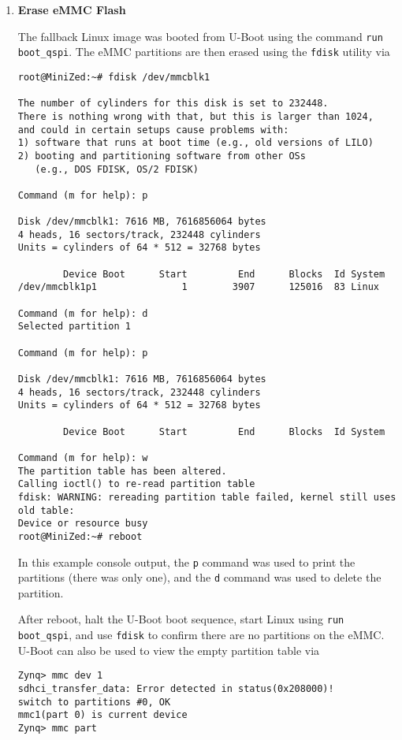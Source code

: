\begin{enumerate}
\item \textbf{Erase eMMC Flash}

The fallback Linux image was booted from U-Boot using the command
\verb+run boot_qspi+. The eMMC partitions are then erased using
the \verb+fdisk+ utility via
%
\begin{verbatim}
root@MiniZed:~# fdisk /dev/mmcblk1

The number of cylinders for this disk is set to 232448.
There is nothing wrong with that, but this is larger than 1024,
and could in certain setups cause problems with:
1) software that runs at boot time (e.g., old versions of LILO)
2) booting and partitioning software from other OSs
   (e.g., DOS FDISK, OS/2 FDISK)

Command (m for help): p

Disk /dev/mmcblk1: 7616 MB, 7616856064 bytes
4 heads, 16 sectors/track, 232448 cylinders
Units = cylinders of 64 * 512 = 32768 bytes

        Device Boot      Start         End      Blocks  Id System
/dev/mmcblk1p1               1        3907      125016  83 Linux

Command (m for help): d
Selected partition 1

Command (m for help): p

Disk /dev/mmcblk1: 7616 MB, 7616856064 bytes
4 heads, 16 sectors/track, 232448 cylinders
Units = cylinders of 64 * 512 = 32768 bytes

        Device Boot      Start         End      Blocks  Id System

Command (m for help): w
The partition table has been altered.
Calling ioctl() to re-read partition table
fdisk: WARNING: rereading partition table failed, kernel still uses old table:
Device or resource busy
root@MiniZed:~# reboot
\end{verbatim}
%
In this example console output, the \verb+p+ command was used to print the
partitions (there was only one), and the \verb+d+ command was used to delete
the partition.

After reboot, halt the U-Boot boot sequence, start Linux using
\verb+run boot_qspi+, and use \verb+fdisk+ to confirm there are no
partitions on the eMMC. U-Boot can also be used to view the
empty partition table via
%
\begin{verbatim}
Zynq> mmc dev 1
sdhci_transfer_data: Error detected in status(0x208000)!
switch to partitions #0, OK
mmc1(part 0) is current device
Zynq> mmc part


\end{verbatim}
\end{enumerate}

